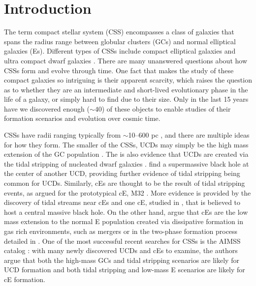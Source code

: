 \documentclass[iop,apj]{emulateapj}
\begin{document}
\maketitle

\section{Introduction}
\label{intro}

\noindent The term compact stellar system (CSS) encompasses a class of galaxies that spans the radius range between globular clusters (GCs) and normal elliptical galaxies (Es). Different types of CSSs include compact elliptical galaxies \citep[cEs;][]{Faber1973} and ultra compact dwarf galaxies \citep[UCDs;][]{Phillipps2001}. There are many unanswered questions about how CSSs form and evolve through time. One fact that makes the study of these compact galaxies so intriguing is their apparent scarcity, which raises the question as to whether they are an intermediate and short-lived evolutionary phase in the life of a galaxy, or simply hard to find due to their size. Only in the last 15 years have we discovered enough ($\sim 40$) of these objects to enable studies of their formation scenarios and evolution over cosmic time.

CSSs have radii ranging typically from $\sim$10--600 pc \citep[e.g.,][]{Norris2014}, and there are multiple ideas for how they form. The smaller of the CSSs, UCDs may simply be the high mass extension of the GC population \citep{Drinkwater2000, Mieske2002}. The is also evidence that UCDs are created via the tidal stripping of nucleated dwarf galaxies \citep{Bekki2001, Bekki2003, Jennings2015, Zhang2015}. \citet{Seth2014} find a supermassive black hole at the center of another UCD, providing further evidence of tidal stripping being common for UCDs. Similarly, cEs are thought to be the result of tidal stripping events, as argued for the prototypical cE, M32 \citep{Choi2002, Graham2002, Huxor2011}. More evidence is provided by the discovery of tidal streams near cEs \citep{SmithCastelli2008a,Chilingarian2009} and one cE, studied in \citet{Kormendy1997}, that is believed to host a central massive black hole. On the other hand, \citet{Wirth1984,Kormendy2009,Kormendy2012a} argue that cEs are the low mass extension to the normal E population created via dissipative formation in gas rich environments, such as mergers or in the two-phase formation process detailed in \citet{Oser2010}. One of the most successful recent searches for CSSs is the AIMSS catalog \citep{Norris2014}: with many newly discovered UCDs and cEs to examine, the authors argue that both the high-mass GCs and tidal stripping scenarios are likely for UCD formation and both tidal stripping and low-mass E scenarios are likely for cE formation.
\end{document}
